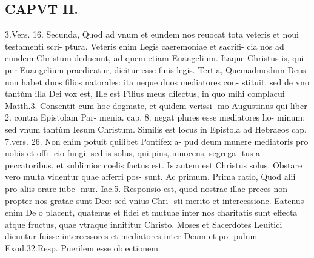 \documentclass{article}
\begin{document}
\begin{pages}
\section*{CAPVT II. }
\marginpar{[ p.57 ]}\pstart 3.Vers. 16. Secunda, Quod ad vnum et eundem nos reuocat tota veteris et noui testamenti scri- ptura. Veteris enim Legis caeremoniae et sacrifi- cia nos ad eundem Christum deducunt, ad quem etiam Euangelium. Itaque Christus is, qui per Euangelium praedicatur, dicitur esse finis legis. Tertia, Quemadmodum Deus non habet duos filios natorales: ita neque duos mediatores con- stituit, sed de vno tantùm illa Dei vox est, Ille est Filius meus dilectus, in quo mihi complacui Matth.3. Consentit cum hoc dogmate, et quidem verissi- mo Augustinus qui liber 2. contra Epistolam Par- menia. cap. 8. negat plures esse mediatores ho- minum: sed vnum tantùm Iesum Christum.  \pend\pstart Similis est locus in Epistola ad Hebraeos cap. 7.vers. 26. Non enim potuit quilibet Pontifex a- pud deum munere mediatoris pro nobis et offi- cio fungi: sed is solus, qui pius, innocens, segrega- tus a peccatoribus, et sublimior coelis factus est. Is autem est Christus solus.  \pend\pstart Obstare vero multa videntur quae afferri pos- sunt. Ac primum.  \pend\pstart Prima ratio, Quod alii pro aliis orare iube- mur. Iac.5. Responsio est, quod nostrae illae preces non propter nos gratae sunt Deo: sed vnius Chri- sti merito et intercessione. Eatenus enim De o placent, quatenus et fidei et mutuae inter nos charitatis sunt effecta atque fructus, quae vtraque  innititur Christo.  \pend{} Moses et Sacerdotes Leuitici dicuntur fuisse intercessores et mediatores inter Deum et po- pulum Exod.32.Resp. Puerilem esse obiectionem.  \pend

\end{pages}
\end{document}
